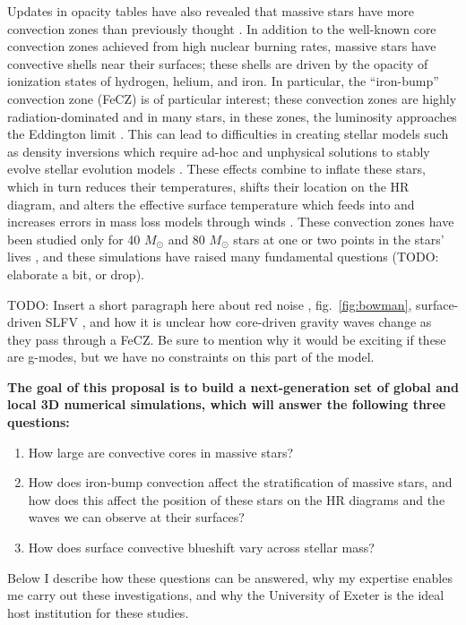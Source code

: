 \documentclass[12pt]{article}
\begin{document}
Updates in opacity tables have also revealed that massive stars have more convection zones than previously thought \citep[][see Fig.~\ref{fig:massive_structure}]{cantiello_etal_2009}.
In addition to the well-known core convection zones achieved from high nuclear burning rates, massive stars have convective shells near their surfaces; these shells are driven by the opacity of ionization states of hydrogen, helium, and iron.
In particular, the ``iron-bump'' convection zone (FeCZ) is of particular interest; these convection zones are highly radiation-dominated and in many stars, in these zones, the luminosity approaches the Eddington limit \citep{jermyn_etal_2022_atlas}.
This can lead to difficulties in creating stellar models such as density inversions which require ad-hoc and unphysical solutions to stably evolve stellar evolution models \citep{kohler_etal_2015}.
These effects combine to inflate these stars, which in turn reduces their temperatures, shifts their location on the HR diagram, and alters the effective surface temperature which feeds into and increases errors in mass loss models through winds \citep{yusof_etal_2013}.
These convection zones have been studied only for 40 $M_{\odot}$ and 80 $M_{\odot}$ stars at one or two points in the stars' lives \citep{jiang_etal_2015}, and these simulations have raised many fundamental questions (TODO: elaborate a bit, or drop).

TODO: Insert a short paragraph here about red noise \citep{bowman_etal_2019}, fig.~\ref{fig:bowman}, surface-driven SLFV \citep{cantiello_etal_2021,schultz_etal_2022}, and how it is unclear how core-driven gravity waves change as they pass through a FeCZ.
Be sure to mention why it would be exciting if these are g-modes, but we have no constraints on this part of the model.


\textbf{The goal of this proposal is to build a next-generation set of global and local 3D numerical simulations, which will answer the following three questions:}\vspace{-0.2cm}
\begin{enumerate}
    \item How large are convective cores in massive stars? \vspace{-0.2cm}
    \item How does iron-bump convection affect the stratification of massive stars, and how does this affect the position of these stars on the HR diagrams and the waves we can observe at their surfaces? \vspace{-0.2cm}
    \item How does surface convective blueshift vary across stellar mass?\vspace{-0.2cm}
\end{enumerate}
Below I describe how these questions can be answered, why my expertise enables me carry out these investigations, and why the University of Exeter is the ideal host institution for these studies.
\end{document}
